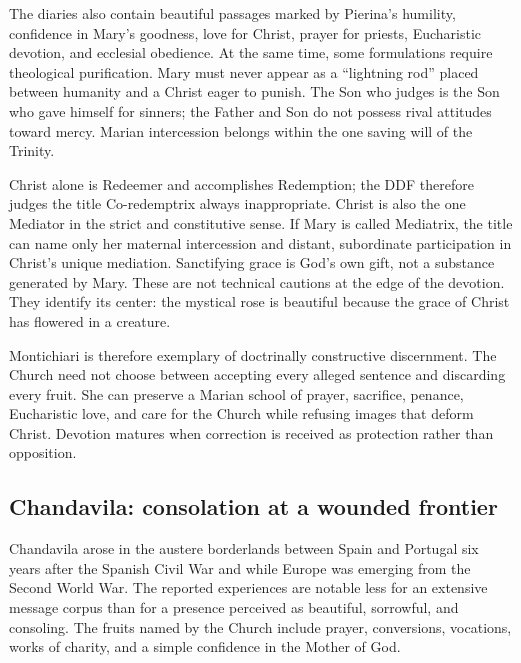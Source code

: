 The diaries also contain beautiful passages marked by Pierina's humility, confidence in Mary's goodness, love for Christ, prayer for priests, Eucharistic devotion, and ecclesial obedience. At the same time, some formulations require theological purification. Mary must never appear as a ``lightning rod'' placed between humanity and a Christ eager to punish. The Son who judges is the Son who gave himself for sinners; the Father and Son do not possess rival attitudes toward mercy. Marian intercession belongs within the one saving will of the Trinity.

Christ alone is Redeemer and accomplishes Redemption; the DDF therefore judges the title Co-redemptrix always inappropriate. Christ is also the one Mediator in the strict and constitutive sense. If Mary is called Mediatrix, the title can name only her maternal intercession and distant, subordinate participation in Christ's unique mediation. Sanctifying grace is God's own gift, not a substance generated by Mary. These are not technical cautions at the edge of the devotion. They identify its center: the mystical rose is beautiful because the grace of Christ has flowered in a creature.

Montichiari is therefore exemplary of doctrinally constructive discernment. The Church need not choose between accepting every alleged sentence and discarding every fruit. She can preserve a Marian school of prayer, sacrifice, penance, Eucharistic love, and care for the Church while refusing images that deform Christ. Devotion matures when correction is received as protection rather than opposition.

\subsection{Chandavila: consolation at a wounded frontier}


Chandavila arose in the austere borderlands between Spain and Portugal six years after the Spanish Civil War and while Europe was emerging from the Second World War. The reported experiences are notable less for an extensive message corpus than for a presence perceived as beautiful, sorrowful, and consoling. The fruits named by the Church include prayer, conversions, vocations, works of charity, and a simple confidence in the Mother of God.

